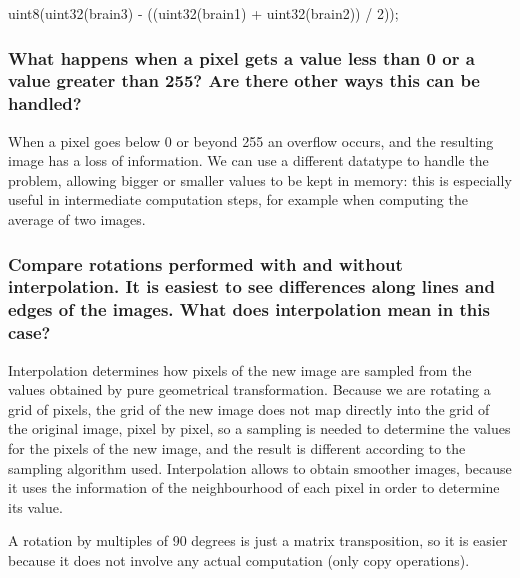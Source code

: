 \documentclass[a4paper]{article}
\begin{document}
uint8(uint32(brain3) - ((uint32(brain1) + uint32(brain2)) / 2));

\subsubsection*{What happens when a pixel gets a value less than 0 or a value
    greater than 255? Are there other ways this can be handled?}

When a pixel goes below 0 or beyond 255 an overflow occurs, and the resulting
image has a loss of information. We can use a different datatype to
handle the problem, allowing bigger or smaller values to be kept in memory:
this is especially useful in intermediate computation steps, for example when
computing the average of two images.

\subsubsection*{Compare rotations performed with and without interpolation. 
    It is easiest to see differences along lines and edges of the images. 
    What does interpolation mean in this case?}

Interpolation determines how pixels of the new image are sampled from the
values obtained by pure geometrical transformation. Because we are rotating a
grid of pixels, the grid of the new image does not map directly into the grid
of the original image, pixel by pixel, so a sampling is needed to determine
the values for the pixels of the new image, and the result is different
according to the sampling algorithm used. Interpolation allows to obtain
smoother images, because it uses the information of the neighbourhood of each
pixel in order to determine its value.

A rotation by multiples of 90 degrees is just a matrix transposition, so it is
easier because it does not involve any actual computation (only copy operations).
\end{document}
